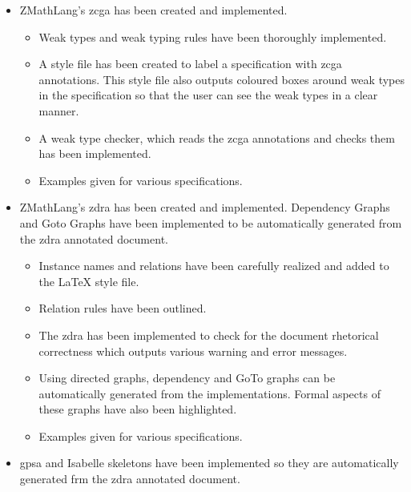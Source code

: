 \begin{itemize}
\item ZMathLang's \gls{zcga} has been created and implemented.

\begin{itemize}

\item Weak types and weak typing rules have been thoroughly implemented. 

\item A style file has been created to label a specification with \gls{zcga} annotations. This style file also outputs coloured boxes around weak types in the specification so that the user can see the weak types in a clear manner.

\item A weak type checker, which reads the \gls{zcga} annotations and checks them has been implemented.

\item Examples given for various specifications.
\end{itemize}

\item ZMathLang's \gls{zdra} has been created and implemented. Dependency Graphs and Goto Graphs have been implemented to be automatically generated from the \gls{zdra} annotated document.

\begin{itemize}
\item Instance names and relations have been carefully realized and added to the \LaTeX{} style file.

\item Relation rules have been outlined.

\item The \gls{zdra} has been implemented to check for the document rhetorical correctness which outputs various warning and error messages.

\item Using directed graphs, dependency and GoTo graphs can be automatically generated from the implementations. Formal aspects of these graphs have also been highlighted.

\item Examples given for various specifications.
\end{itemize}

\item \gls{gpsa} and Isabelle skeletons have been implemented so they are automatically generated frm the \gls{zdra} annotated document.


\end{itemize}
